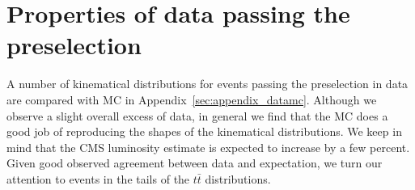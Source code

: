 \section{Properties of data passing the preselection}
\label{sec:bulk}
A number of kinematical distributions for events passing 
the preselection in data are compared with MC in 
Appendix~\ref{sec:appendix_datamc}. Although we observe a
slight overall excess of data, in general we find that
the MC does a good job of reproducing the shapes of the
kinematical distributions. We keep in mind that the CMS 
luminosity estimate is expected to increase by a few percent. 
Given good observed agreement between data and expectation, 
we turn our attention to events in the tails of the $t\bar{t}$ 
distributions. 
